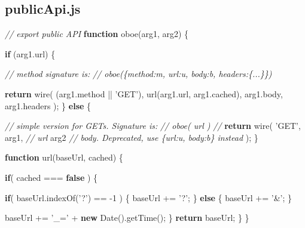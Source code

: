 \documentclass[12pt, ]{article}
\newenvironment{Shaded}{}{}
\newcommand{\KeywordTok}[1]{\textcolor[rgb]{0.00,0.44,0.13}{\textbf{{#1}}}}
\newcommand{\DecValTok}[1]{\textcolor[rgb]{0.25,0.63,0.44}{{#1}}}
\newcommand{\StringTok}[1]{\textcolor[rgb]{0.25,0.44,0.63}{{#1}}}
\newcommand{\CommentTok}[1]{\textcolor[rgb]{0.38,0.63,0.69}{\textit{{#1}}}}
\newcommand{\OtherTok}[1]{\textcolor[rgb]{0.00,0.44,0.13}{{#1}}}
\newcommand{\FunctionTok}[1]{\textcolor[rgb]{0.02,0.16,0.49}{{#1}}}
\newcommand{\NormalTok}[1]{{#1}}
\begin{document}
\pagebreak

\subsection{publicApi.js}\label{headerux5fpublicApi}

\label{src_publicApi}

\begin{Shaded}
\begin{Highlighting}[]
\CommentTok{// export public API}
\KeywordTok{function} \FunctionTok{oboe}\NormalTok{(arg1, arg2) \{}

   \KeywordTok{if} \NormalTok{(}\OtherTok{arg1}\NormalTok{.}\FunctionTok{url}\NormalTok{) \{}

      \CommentTok{// method signature is:}
      \CommentTok{//    oboe(\{method:m, url:u, body:b, headers:\{...\}\})}

      \KeywordTok{return} \FunctionTok{wire}\NormalTok{(}
         \NormalTok{(}\OtherTok{arg1}\NormalTok{.}\FunctionTok{method} \NormalTok{|| }\StringTok{'GET'}\NormalTok{),}
         \FunctionTok{url}\NormalTok{(}\OtherTok{arg1}\NormalTok{.}\FunctionTok{url}\NormalTok{, }\OtherTok{arg1}\NormalTok{.}\FunctionTok{cached}\NormalTok{),}
         \OtherTok{arg1}\NormalTok{.}\FunctionTok{body}\NormalTok{,}
         \OtherTok{arg1}\NormalTok{.}\FunctionTok{headers}
      \NormalTok{);}
   \NormalTok{\} }\KeywordTok{else} \NormalTok{\{}

      \CommentTok{//  simple version for GETs. Signature is:}
      \CommentTok{//    oboe( url )            }
      \CommentTok{//                                }
      \KeywordTok{return} \FunctionTok{wire}\NormalTok{(}
         \StringTok{'GET'}\NormalTok{,}
         \NormalTok{arg1, }\CommentTok{// url}
         \NormalTok{arg2  }\CommentTok{// body. Deprecated, use \{url:u, body:b\} instead}
      \NormalTok{);}
   \NormalTok{\}}
   
   \KeywordTok{function} \FunctionTok{url}\NormalTok{(baseUrl, cached) \{}
     
      \KeywordTok{if}\NormalTok{( cached === }\KeywordTok{false} \NormalTok{) \{}
           
         \KeywordTok{if}\NormalTok{( }\OtherTok{baseUrl}\NormalTok{.}\FunctionTok{indexOf}\NormalTok{(}\StringTok{'?'}\NormalTok{) == -}\DecValTok{1} \NormalTok{) \{}
            \NormalTok{baseUrl += }\StringTok{'?'}\NormalTok{;}
         \NormalTok{\} }\KeywordTok{else} \NormalTok{\{}
            \NormalTok{baseUrl += }\StringTok{'&'}\NormalTok{;}
         \NormalTok{\}}
         
         \NormalTok{baseUrl += }\StringTok{'_='} \NormalTok{+ }\KeywordTok{new} \FunctionTok{Date}\NormalTok{().}\FunctionTok{getTime}\NormalTok{();}
      \NormalTok{\}}
      \KeywordTok{return} \NormalTok{baseUrl;}
   \NormalTok{\}}
\NormalTok{\}}
\end{Highlighting}
\end{Shaded}
\end{document}
